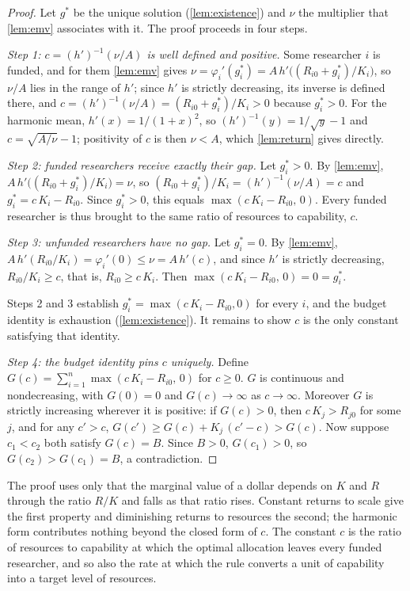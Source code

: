 \begin{proof}
Let $g^*$ be the unique solution (\cref{lem:existence}) and $\nu$ the multiplier that \cref{lem:emv} associates with it. The proof proceeds in four steps.

\emph{Step 1: $c = (h')^{-1}(\nu/A)$ is well defined and positive.} Some researcher $i$ is funded, and for them \cref{lem:emv} gives $\nu = \varphi_i'(g_i^*) = A\,h'\big((R_{i0} + g_i^*)/K_i\big)$, so $\nu/A$ lies in the range of $h'$; since $h'$ is strictly decreasing, its inverse is defined there, and $c = (h')^{-1}(\nu/A) = (R_{i0} + g_i^*)/K_i > 0$ because $g_i^* > 0$. For the harmonic mean, $h'(x) = 1/(1 + x)^2$, so $(h')^{-1}(y) = 1/\sqrt{y} - 1$ and $c = \sqrt{A/\nu} - 1$; positivity of $c$ is then $\nu < A$, which \cref{lem:return} gives directly.

\emph{Step 2: funded researchers receive exactly their gap.} Let $g_i^* > 0$. By \cref{lem:emv}, $A\,h'\big((R_{i0} + g_i^*)/K_i\big) = \nu$, so $(R_{i0} + g_i^*)/K_i = (h')^{-1}(\nu/A) = c$ and $g_i^* = c\,K_i - R_{i0}$. Since $g_i^* > 0$, this equals $\max(c\,K_i - R_{i0},\, 0)$. Every funded researcher is thus brought to the same ratio of resources to capability, $c$.

\emph{Step 3: unfunded researchers have no gap.} Let $g_i^* = 0$. By \cref{lem:emv}, $A\,h'(R_{i0}/K_i) = \varphi_i'(0) \leq \nu = A\,h'(c)$, and since $h'$ is strictly decreasing, $R_{i0}/K_i \geq c$, that is, $R_{i0} \geq c\,K_i$. Then $\max(c\,K_i - R_{i0},\, 0) = 0 = g_i^*$.

Steps 2 and 3 establish $g_i^* = \max(c\,K_i - R_{i0}, 0)$ for every $i$, and the budget identity is exhaustion (\cref{lem:existence}). It remains to show $c$ is the only constant satisfying that identity.

\emph{Step 4: the budget identity pins $c$ uniquely.} Define $G(c) = \sum_{i=1}^n \max(c\,K_i - R_{i0},\, 0)$ for $c \geq 0$. $G$ is continuous and nondecreasing, with $G(0) = 0$ and $G(c) \to \infty$ as $c \to \infty$. Moreover $G$ is strictly increasing wherever it is positive: if $G(c) > 0$, then $c\,K_j > R_{j0}$ for some $j$, and for any $c' > c$, $G(c') \geq G(c) + K_j\,(c' - c) > G(c)$. Now suppose $c_1 < c_2$ both satisfy $G(c) = B$. Since $B > 0$, $G(c_1) > 0$, so $G(c_2) > G(c_1) = B$, a contradiction.
\end{proof}

The proof uses only that the marginal value of a dollar depends on $K$ and $R$ through the ratio $R/K$ and falls as that ratio rises. Constant returns to scale give the first property and diminishing returns to resources the second; the harmonic form contributes nothing beyond the closed form of $c$. The constant $c$ is the ratio of resources to capability at which the optimal allocation leaves every funded researcher, and so also the rate at which the rule converts a unit of capability into a target level of resources.

